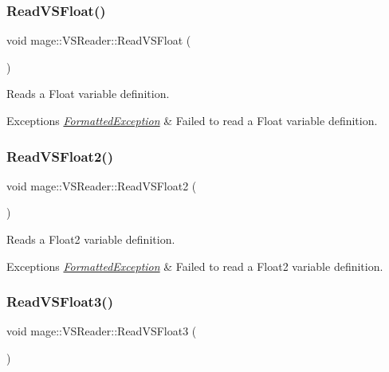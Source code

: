 \subsubsection{\texorpdfstring{Read\+V\+S\+Float()}{ReadVSFloat()}}
{\footnotesize\ttfamily void mage\+::\+V\+S\+Reader\+::\+Read\+V\+S\+Float (\begin{DoxyParamCaption}{ }\end{DoxyParamCaption})\hspace{0.3cm}{\ttfamily [private]}}

Reads a Float variable definition.


\begin{DoxyExceptions}{Exceptions}
{\em \hyperlink{structmage_1_1_formatted_exception}{Formatted\+Exception}} & Failed to read a Float variable definition. \\
\hline
\end{DoxyExceptions}
\hypertarget{classmage_1_1_v_s_reader_a18c7821c219354d84f0071a5bfa8651c}{}\label{classmage_1_1_v_s_reader_a18c7821c219354d84f0071a5bfa8651c} 
\subsubsection{\texorpdfstring{Read\+V\+S\+Float2()}{ReadVSFloat2()}}
{\footnotesize\ttfamily void mage\+::\+V\+S\+Reader\+::\+Read\+V\+S\+Float2 (\begin{DoxyParamCaption}{ }\end{DoxyParamCaption})\hspace{0.3cm}{\ttfamily [private]}}

Reads a Float2 variable definition.


\begin{DoxyExceptions}{Exceptions}
{\em \hyperlink{structmage_1_1_formatted_exception}{Formatted\+Exception}} & Failed to read a Float2 variable definition. \\
\hline
\end{DoxyExceptions}
\hypertarget{classmage_1_1_v_s_reader_a63d8c0cb3108d8aa0f582a59b44db6ac}{}\label{classmage_1_1_v_s_reader_a63d8c0cb3108d8aa0f582a59b44db6ac} 
\subsubsection{\texorpdfstring{Read\+V\+S\+Float3()}{ReadVSFloat3()}}
{\footnotesize\ttfamily void mage\+::\+V\+S\+Reader\+::\+Read\+V\+S\+Float3 (\begin{DoxyParamCaption}{ }\end{DoxyParamCaption})\hspace{0.3cm}{\ttfamily [private]}}

